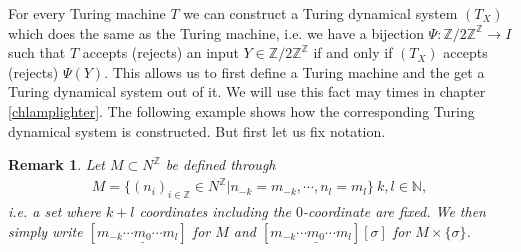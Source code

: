 \documentclass[12pt,a4paper]{scrartcl}
\theoremstyle{plain}
\newtheorem{Remark}[Theorem]{Remark}
\theoremstyle{definition}
\numberwithin{equation}{section}
\newcommand{\Z}{\mathbb{Z}} %
\newcommand{\N}{\mathbb{N}} %
\newcommand{\2}{\mathbb{Z} / 2 \mathbb{Z}}
\newcommand{\1}{\bar{1}}
\newcommand{\0}{\bar{0}}
\begin{document}
For every Turing machine $T$ we can construct a Turing dynamical system $(T_X)$ which does the same as the Turing machine, i.e. we have a bijection $\Psi: \2^\Z \to I$ such that $T$ accepts (rejects) an input $Y \in \2^\Z$ if and only if $(T_X)$ accepts (rejects) $\Psi(Y)$. This allows us to first define a Turing machine and the get a Turing dynamical system out of it. We will use this fact may times in chapter \ref{chlamplighter}. The following example shows how the corresponding Turing dynamical system is constructed. But first let us fix notation.
\begin{Remark}
	Let $M \subset N^\Z$  be defined through 
	\begin{align*}
		M = \{(n_i)_{i \in \Z} \in N^\Z | n_{-k} = m_{-k}, \cdots, n_l = m_l \} \ k,l \in \N,
	\end{align*}
	i.e. a set where $k+l$ coordinates including the $0$-coordinate are fixed. We then simply write $[m_{-k} \cdots \underline{m_0} \cdots m_l]$ for $M$ and $[m_{-k} \cdots \underline{m_0} \cdots m_l][\sigma]$ for $M \times \{\sigma\}$.
\end{Remark}
\end{document}
